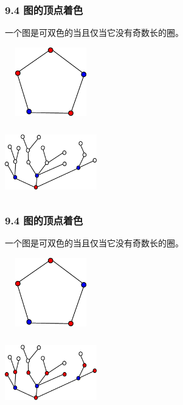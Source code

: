 \documentclass{beamer}
\begin{document}
\begin{CJK}{UTF8}{gbsn}
\begin{frame}
  \frametitle{9.4 图的顶点着色}
  \begin{theorem9.4.1}
    一个图是可双色的当且仅当它没有奇数长的圈。
  \end{theorem9.4.1}
\vspace{1cm}
  \begin{minipage}{0.45\linewidth}
\includegraphics[width=4cm,height=3cm]{pentagon5}    
  \end{minipage}
  \begin{minipage}{0.45\linewidth}
    \includegraphics[width=4cm,height=3cm]{color22}
  \end{minipage}
\end{frame}
\begin{frame}
  \frametitle{9.4 图的顶点着色}
  \begin{theorem9.4.1}
    一个图是可双色的当且仅当它没有奇数长的圈。
  \end{theorem9.4.1}
\vspace{1cm}
  \begin{minipage}{0.45\linewidth}
\includegraphics[width=4cm,height=3cm]{pentagon5}    
  \end{minipage}
  \begin{minipage}{0.45\linewidth}
    \includegraphics[width=4cm,height=3cm]{color23}

\end{minipage}
\end{frame}
\end{CJK}
\end{document}
